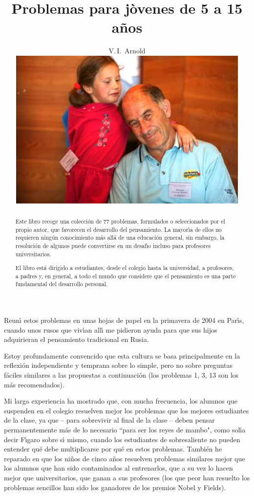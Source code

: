 \documentclass[12pt, spanish]{article}  %
\title{Problemas para j\`{o}venes de 5 a 15 a\~{n}os}
\author{V.\,I.~Arnold
\vspace*{2cm}\\ 
\includegraphics[width=12cm]{photo-arnold_small}
}
\date{}
\begin{document}
\def\eps{\varepsilon}
\maketitle
\thispagestyle{empty}

\newpage 
\setcounter{page}{1}
\begin{abstract}

Este libro recoge una colecci\'on de 77 problemas, formulados o seleccionados por el propio autor, 
que favorecen el desarrollo del pensamiento.
La mayor\'{\i}a de ellos no requieren ning\'un conocimiento m\'as all\'a de una educaci\'on general, 
sin embargo, la resoluci\'on de algunos puede convertirse en un desaf\'{\i}o incluso para profesores 
universitarios.

El libro est\'a dirigido a estudiantes, desde el colegio hasta la universidad, a profesores, 
a padres y, en general, a todo el mundo que considere que el pensamiento es una parte fundamental del desarrollo personal.
\end{abstract}

\newpage


Reun\'{\i} estos problemas en unas hojas de papel en la primavera de 2004 en Par\'{\i}s, cuando unos rusos 
que viv\'{\i}an all\'{\i} me pidieron ayuda para que sus hijos adquirieran el pensamiento tradicional en Rusia.

Estoy profundamente convencido que esta cultura se basa principalmente en la reflexi\'on independiente y
temprana sobre lo simple, pero no sobre preguntas f\'aciles similares a las propuestas a continuaci\'on 
(los problemas 1, 3, 13 son los m\'as recomendados).

Mi larga experiencia ha mostrado que, con mucha frecuencia, los alumnos que suspenden en el colegio 
resuelven mejor los problemas que los mejores estudiantes de la clase, ya que -- para sobrevivir al final
 de la clase -- deben pensar permanentemente m\'as de lo necesario ``para ser los reyes de mambo", 
 como sol\'{\i}a decir F\'{\i}garo sobre s\'{\i} mismo,
cuando los estudiantes de sobresaliente no pueden entender qu\'e debe multiplicarse por qu\'e en estos problemas.
Tambi\'en he reparado en que los ni\~nos de cinco a\~nos resuelven problemas similares mejor 
que los alumnos que han sido contaminados al entrenarlos, que a su vez lo hacen mejor que universitarios, 
que ganan a sus profesores (los que peor han resuelto los problemas sencillos han sido los ganadores de los premios 
Nobel y Fields).   

\ 
\end{document}
